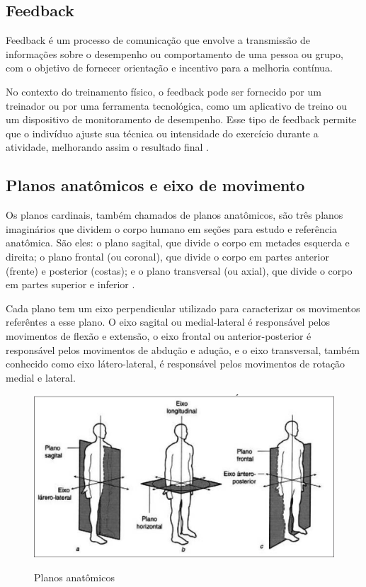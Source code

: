 \subsection[Feedback]{Feedback}

Feedback é um processo de comunicação que envolve a transmissão de informações sobre o desempenho ou comportamento de uma pessoa ou grupo, com o objetivo de fornecer orientação e incentivo para a melhoria contínua. 

No contexto do treinamento físico, o feedback pode ser fornecido por um treinador ou por uma ferramenta tecnológica, como um aplicativo de treino ou um dispositivo de monitoramento de desempenho. Esse tipo de feedback permite que o indivíduo ajuste sua técnica ou intensidade do exercício durante a atividade, melhorando assim o resultado final \cite{feedback}.




\subsection[Planos anatômicos e eixo de movimento]{Planos anatômicos e eixo de movimento}

Os planos cardinais, também chamados de planos anatômicos, são três planos imaginários que dividem o corpo humano em seções para estudo e referência anatômica. São eles: o plano sagital, que divide o corpo em metades esquerda e direita; o plano frontal (ou coronal), que divide o corpo em partes anterior (frente) e posterior (costas); e o plano transversal (ou axial), que divide o corpo em partes superior e inferior \cite{cinesiologia}.

Cada plano tem um eixo perpendicular utilizado para caracterizar os movimentos referêntes a esse plano. O eixo sagital ou medial-lateral é responsável pelos movimentos de flexão e extensão, o eixo frontal ou anterior-posterior é responsável pelos movimentos de abdução e adução, e o eixo transversal, também conhecido como eixo látero-lateral, é responsável pelos movimentos de rotação medial e lateral\cite{cinesiologia}.


\begin{figure}[!htb]
	\centering
    \caption{Planos anatômicos}
	\includegraphics[scale=0.15]{figuras/TAF/planos.png}
	\label{fig:Planos anatomicos}
\end{figure}


